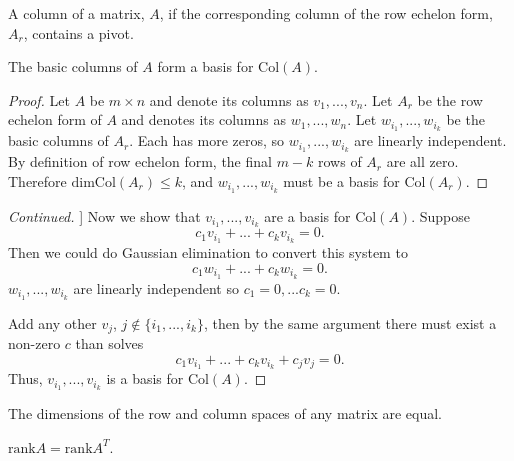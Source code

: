 \documentclass[compress]{beamer}
\newcommand{\rank}{\mathrm{rank}}
\newcommand{\col}{\mathrm{Col}}
\renewcommand{\dim}{\mathrm{dim}}
\begin{document}
\begin{frame}
  \begin{definition}
    A column of a matrix, $A$, if the corresponding column of the row
    echelon form, $A_r$, contains a pivot. 
  \end{definition}
  \begin{theorem}
    The basic columns of $A$ form a basis for $\col(A)$. 
  \end{theorem}
  \begin{proof}
    Let $A$ be $m \times n$ and denote its columns as $v_1,...,v_n$. Let
    $A_r$ be the row echelon form of $A$ and denotes its columns as
    $w_1,...,w_n$. Let $w_{i_1}, ..., w_{i_k}$ be the basic columns of
    $A_r$. Each has more zeros, so $w_{i_1},...,w_{i_k}$
    are linearly independent. By definition of row echelon form, the
    final $m-k$ rows of $A_r$ are all zero. Therefore $\dim \col(A_r) \leq
    k$, and $w_{i_1},...,w_{i_k}$ must be a basis for $\col(A_r)$.
  \end{proof}    
\end{frame}
\begin{frame}
  \begin{proof}[Continued]]
    Now we show that $v_{i_1}, ..., v_{i_k}$ are a basis for
    $\col(A)$. Suppose
    \[ c_1 v_{i_1} + ... + c_k v_{i_k} = 0. \]
    Then we could do Gaussian elimination to convert this system to
    \[ c_1 w_{i_1} + ... + c_k w_{i_k} = 0. \]
    $w_{i_1},... , w_{i_k}$ are linearly independent so $c_1 = 0
    ,... c_k = 0$.
    
    Add any other $v_j$, $j \not\in \{i_1, ..., i_k\}$,
    then by the same argument there must exist a non-zero $c$ than
    solves 
    \[ c_1 v_{i_1} + ... + c_k v_{i_k} + c_j v_j = 0. \]
    Thus, $v_{i_1} , ..., v_{i_k}$ is a basis for $\col(A)$. 
  \end{proof}
\end{frame}

\begin{frame}
  \begin{corollary}
    The dimensions of the row and column spaces of any matrix are
    equal. 
  \end{corollary}
  \begin{corollary}
    $\rank A = \rank A^T$.
  \end{corollary}
\end{frame}
\end{document}

